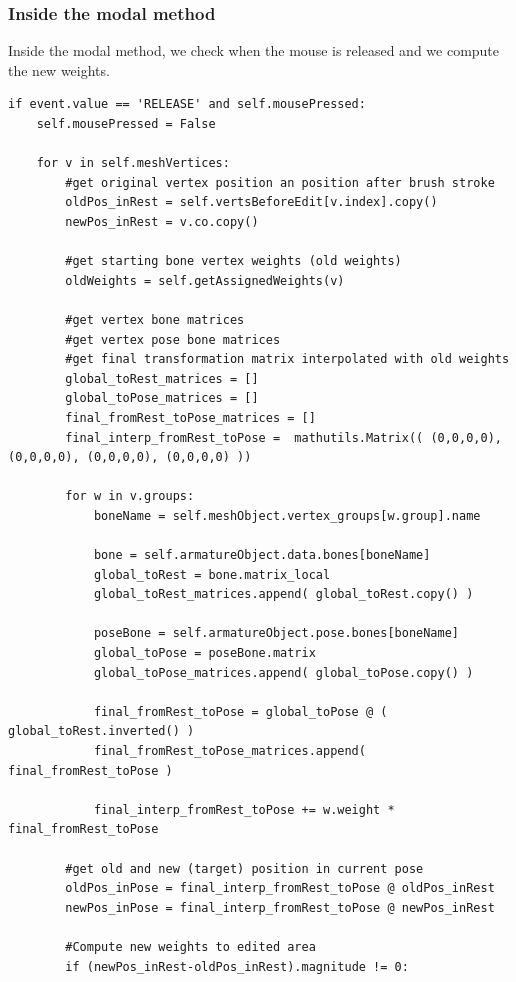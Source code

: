 \documentclass[12pt,twoside]{report}
\begin{document}
\subsubsection{Inside the modal method}
Inside the modal method, we check when the mouse is released and we compute the new weights.
\begin{lstlisting}
if event.value == 'RELEASE' and self.mousePressed:
    self.mousePressed = False
    
    for v in self.meshVertices:
        #get original vertex position an position after brush stroke
        oldPos_inRest = self.vertsBeforeEdit[v.index].copy()
        newPos_inRest = v.co.copy()
        
        #get starting bone vertex weights (old weights)
        oldWeights = self.getAssignedWeights(v)
        
        #get vertex bone matrices
        #get vertex pose bone matrices
        #get final transformation matrix interpolated with old weights
        global_toRest_matrices = []
        global_toPose_matrices = []
        final_fromRest_toPose_matrices = []
        final_interp_fromRest_toPose =  mathutils.Matrix(( (0,0,0,0), (0,0,0,0), (0,0,0,0), (0,0,0,0) ))
        
        for w in v.groups:
            boneName = self.meshObject.vertex_groups[w.group].name
            
            bone = self.armatureObject.data.bones[boneName]
            global_toRest = bone.matrix_local
            global_toRest_matrices.append( global_toRest.copy() )
            
            poseBone = self.armatureObject.pose.bones[boneName]
            global_toPose = poseBone.matrix
            global_toPose_matrices.append( global_toPose.copy() )
            
            final_fromRest_toPose = global_toPose @ ( global_toRest.inverted() )
            final_fromRest_toPose_matrices.append( final_fromRest_toPose )
            
            final_interp_fromRest_toPose += w.weight * final_fromRest_toPose
        
        #get old and new (target) position in current pose
        oldPos_inPose = final_interp_fromRest_toPose @ oldPos_inRest
        newPos_inPose = final_interp_fromRest_toPose @ newPos_inRest
        
        #Compute new weights to edited area
        if (newPos_inRest-oldPos_inRest).magnitude != 0:
            

\end{lstlisting}
\end{document}
